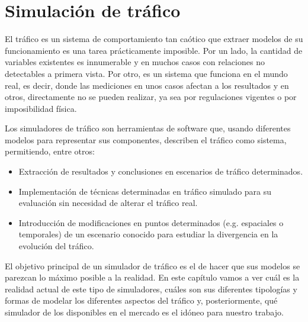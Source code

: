\chapter{Simulación de tráfico}
\label{ch:sota-traffic-simulation}


El tráfico es un sistema de comportamiento tan caótico que extraer modelos de su funcionamiento es una tarea prácticamente imposible. Por un lado, la cantidad de variables existentes es innumerable y en muchos casos con relaciones no detectables a primera vista. Por otro, es un sistema que funciona en el mundo real, es decir, donde las mediciones en unos casos afectan a los resultados y en otros, directamente no se pueden realizar, ya sea por regulaciones vigentes o por imposibilidad física.

Los simuladores de tráfico son herramientas de software que, usando diferentes modelos para representar sus componentes, describen el tráfico como sistema, permitiendo, entre otros:

\begin{itemize}
	\item Extracción de resultados y conclusiones en escenarios de tráfico determinados.
	\item Implementación de técnicas determinadas en tráfico simulado para su evaluación sin necesidad de alterar el tráfico real.
	\item Introducción de modificaciones en puntos determinados (e.g. espaciales o temporales) de un escenario conocido para estudiar la divergencia en la evolución del tráfico.
\end{itemize}

El objetivo principal de un simulador de tráfico es el de hacer que sus modelos se parezcan lo máximo posible a la realidad. En este capítulo vamos a ver cuál es la realidad actual de este tipo de simuladores, cuáles son sus diferentes tipologías y formas de modelar los diferentes aspectos del tráfico y, posteriormente, qué simulador de los disponibles en el mercado es el idóneo para nuestro trabajo.



